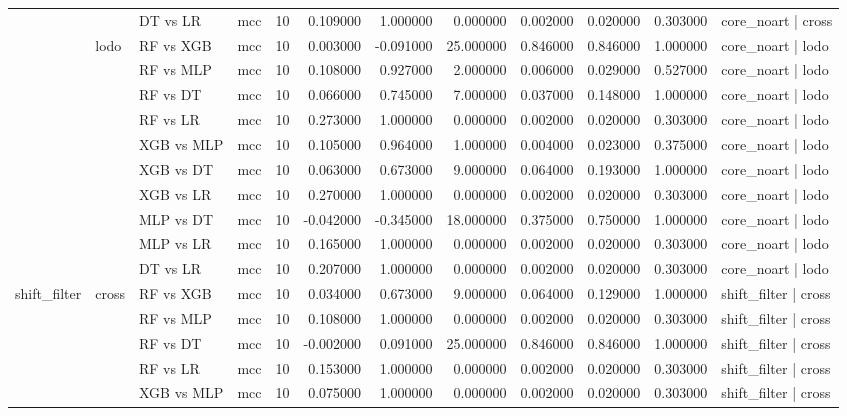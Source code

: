 \begin{tabular}{llllrrrrrrrl}
 &  & DT vs LR & mcc & 10 & 0.109000 & 1.000000 & 0.000000 & 0.002000 & 0.020000 & 0.303000 & core_noart | cross \\
\cline{2-12}
 & \multirow[t]{10}{*}{lodo} & RF vs XGB & mcc & 10 & 0.003000 & -0.091000 & 25.000000 & 0.846000 & 0.846000 & 1.000000 & core_noart | lodo \\
 &  & RF vs MLP & mcc & 10 & 0.108000 & 0.927000 & 2.000000 & 0.006000 & 0.029000 & 0.527000 & core_noart | lodo \\
 &  & RF vs DT & mcc & 10 & 0.066000 & 0.745000 & 7.000000 & 0.037000 & 0.148000 & 1.000000 & core_noart | lodo \\
 &  & RF vs LR & mcc & 10 & 0.273000 & 1.000000 & 0.000000 & 0.002000 & 0.020000 & 0.303000 & core_noart | lodo \\
 &  & XGB vs MLP & mcc & 10 & 0.105000 & 0.964000 & 1.000000 & 0.004000 & 0.023000 & 0.375000 & core_noart | lodo \\
 &  & XGB vs DT & mcc & 10 & 0.063000 & 0.673000 & 9.000000 & 0.064000 & 0.193000 & 1.000000 & core_noart | lodo \\
 &  & XGB vs LR & mcc & 10 & 0.270000 & 1.000000 & 0.000000 & 0.002000 & 0.020000 & 0.303000 & core_noart | lodo \\
 &  & MLP vs DT & mcc & 10 & -0.042000 & -0.345000 & 18.000000 & 0.375000 & 0.750000 & 1.000000 & core_noart | lodo \\
 &  & MLP vs LR & mcc & 10 & 0.165000 & 1.000000 & 0.000000 & 0.002000 & 0.020000 & 0.303000 & core_noart | lodo \\
 &  & DT vs LR & mcc & 10 & 0.207000 & 1.000000 & 0.000000 & 0.002000 & 0.020000 & 0.303000 & core_noart | lodo \\
\cline{1-12} \cline{2-12}
\multirow[t]{20}{*}{shift_filter} & \multirow[t]{10}{*}{cross} & RF vs XGB & mcc & 10 & 0.034000 & 0.673000 & 9.000000 & 0.064000 & 0.129000 & 1.000000 & shift_filter | cross \\
 &  & RF vs MLP & mcc & 10 & 0.108000 & 1.000000 & 0.000000 & 0.002000 & 0.020000 & 0.303000 & shift_filter | cross \\
 &  & RF vs DT & mcc & 10 & -0.002000 & 0.091000 & 25.000000 & 0.846000 & 0.846000 & 1.000000 & shift_filter | cross \\
 &  & RF vs LR & mcc & 10 & 0.153000 & 1.000000 & 0.000000 & 0.002000 & 0.020000 & 0.303000 & shift_filter | cross \\
 &  & XGB vs MLP & mcc & 10 & 0.075000 & 1.000000 & 0.000000 & 0.002000 & 0.020000 & 0.303000 & shift_filter | cross \\

\end{tabular}
